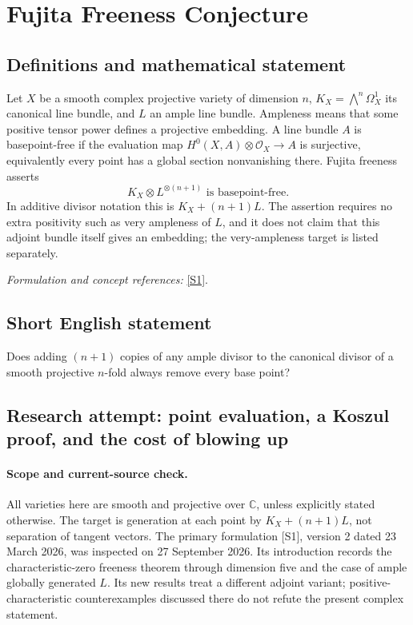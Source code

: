 \documentclass[11pt]{article}
\begin{document}
\section*{\texorpdfstring{Fujita Freeness Conjecture}{Fujita Freeness Conjecture}}\label{363}
\subsection{Definitions and mathematical statement}
Let $X$ be a smooth complex projective variety of dimension $n$, $K_X=\bigwedge^n\Omega_X^1$ its canonical line bundle, and $L$ an ample line bundle. Ampleness means that some positive tensor power defines a projective embedding. A line bundle $A$ is basepoint-free if the evaluation map $H^0(X,A)\otimes\mathcal O_X\to A$ is surjective, equivalently every point has a global section nonvanishing there. Fujita freeness asserts
\[
 K_X\otimes L^{\otimes(n+1)}\text{ is basepoint-free}.
\]
In additive divisor notation this is $K_X+(n+1)L$. The assertion requires no extra positivity such as very ampleness of $L$, and it does not claim that this adjoint bundle itself gives an embedding; the very-ampleness target is listed separately.
\par\smallskip\textit{Formulation and concept references:} \href{https://arxiv.org/abs/2408.06530v2}{[S1]}.

\subsection{Short English statement}
Does adding $(n+1)$ copies of any ample divisor to the canonical divisor of a smooth projective $n$-fold always remove every base point?
\subsection{Research attempt: point evaluation, a Koszul proof, and the cost of blowing up}
\paragraph{Scope and current-source check.}
All varieties here are smooth and projective over $\mathbb C$, unless explicitly stated otherwise. The target is generation at each point by $K_X+(n+1)L$, not separation of tangent vectors. The primary formulation [S1], version 2 dated 23 March 2026, was inspected on 27 September 2026. Its introduction records the characteristic-zero freeness theorem through dimension five and the case of ample globally generated $L$. Its new results treat a different adjoint variant; positive-characteristic counterexamples discussed there do not refute the present complex statement.
\end{document}

